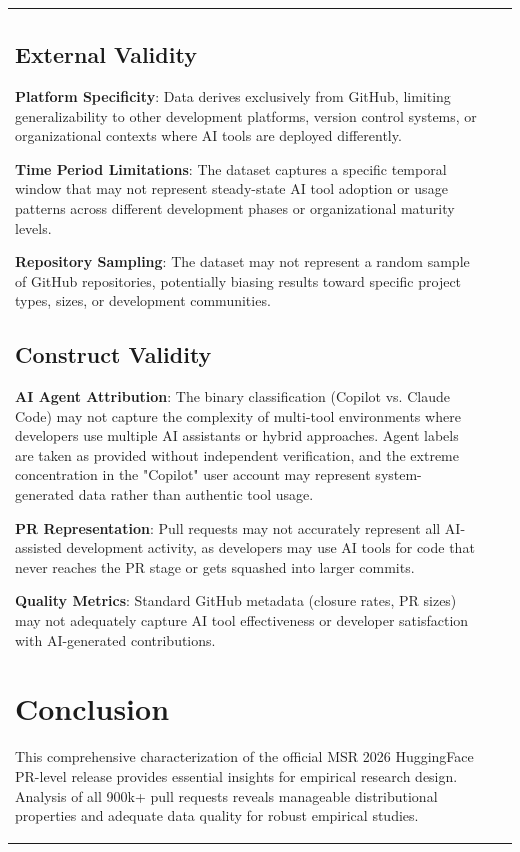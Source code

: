 \documentclass[conference]{IEEEtran}
\begin{document}
\begin{table}[t]
\begin{tabular}{@{}lrr@{}}
\subsection{External Validity}

\textbf{Platform Specificity}: Data derives exclusively from GitHub, limiting generalizability to other development platforms, version control systems, or organizational contexts where AI tools are deployed differently.

\textbf{Time Period Limitations}: The dataset captures a specific temporal window that may not represent steady-state AI tool adoption or usage patterns across different development phases or organizational maturity levels.

\textbf{Repository Sampling}: The dataset may not represent a random sample of GitHub repositories, potentially biasing results toward specific project types, sizes, or development communities.

\subsection{Construct Validity}

\textbf{AI Agent Attribution}: The binary classification (Copilot vs. Claude Code) may not capture the complexity of multi-tool environments where developers use multiple AI assistants or hybrid approaches. Agent labels are taken as provided without independent verification, and the extreme concentration in the "Copilot" user account may represent system-generated data rather than authentic tool usage.

\textbf{PR Representation}: Pull requests may not accurately represent all AI-assisted development activity, as developers may use AI tools for code that never reaches the PR stage or gets squashed into larger commits.

\textbf{Quality Metrics}: Standard GitHub metadata (closure rates, PR sizes) may not adequately capture AI tool effectiveness or developer satisfaction with AI-generated contributions.

\section{Conclusion}

This comprehensive characterization of the official MSR 2026 HuggingFace PR-level release provides essential insights for empirical research design. Analysis of all 900k+ pull requests reveals manageable distributional properties and adequate data quality for robust empirical studies.


\end{tabular}
\end{table}
\end{document}
